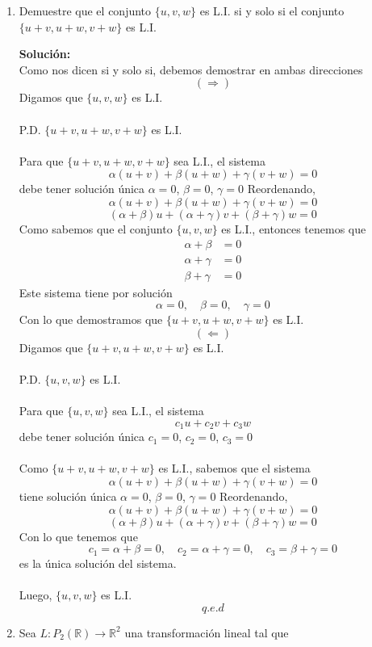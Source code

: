 \documentclass[12pt]{article}
\newenvironment{solucion}
{\begin{mdframed}[backgroundcolor=black!10]
		{\bf Solución:}\\
	}
	{
	\end{mdframed}
}
\newenvironment{preguntas}
{\begin{enumerate}\itemsep12pt
	}
	{
	\end{enumerate}
}
\newcommand{\ra}{\rightarrow}
\newcommand{\R}{\mathbb{R}}
\begin{document}
\begin{preguntas}
\begin{solucion}
\end{solucion}
\item Demuestre que el conjunto $\{u, v, w\}$ es L.I. si y solo si el conjunto $\{u+v, u+w, v+w\}$ es L.I.
\begin{solucion}
Como nos dicen si y solo si, debemos demostrar en ambas direcciones
		$$(\Longrightarrow)$$
		Digamos que $\{u, v, w\}$ es L.I.\\
		\\
		P.D. $\{u+v, u+w, v+w\}$ es L.I.\\
		\\
		Para que $\{u+v, u+w, v+w\}$ sea L.I., el sistema
		$$\alpha (u+v) + \beta (u+w) + \gamma (v+w) = 0$$
		debe tener solución única $\alpha = 0$, $\beta = 0$, $\gamma = 0$
		Reordenando,
		$$\alpha (u+v) + \beta (u+w) + \gamma (v+w) = 0$$
		$$(\alpha + \beta) u + (\alpha + \gamma) v + (\beta + \gamma) w = 0$$
		Como sabemos que el conjunto $\{u, v, w\}$ es L.I., entonces tenemos que
		$$\begin{array}{rl}
		\alpha + \beta & = 0\\
		\alpha + \gamma & = 0\\
		\beta + \gamma & = 0
		\end{array}$$
		Este sistema tiene por solución
		$$\alpha = 0, \quad \beta = 0, \quad \gamma = 0$$
		Con lo que demostramos que $\{u+v, u+w, v+w\}$ es L.I.
		$$(\Longleftarrow)$$
		Digamos que $\{u+v, u+w, v+w\}$ es L.I.\\
		\\
		P.D. $\{u, v, w\}$ es L.I.\\
		\\
		Para que $\{u, v, w\}$ sea L.I., el sistema
		$$c_1u + c_2v + c_3w$$
		debe tener solución única $c_1 = 0$, $c_2 = 0$, $c_3 = 0$\\
		\\
		Como $\{u+v, u+w, v+w\}$ es L.I., sabemos que el sistema
		$$\alpha (u+v) + \beta (u+w) + \gamma (v+w) = 0$$
		tiene solución única $\alpha = 0$, $\beta = 0$, $\gamma = 0$
		Reordenando,
		$$\alpha (u+v) + \beta (u+w) + \gamma (v+w) = 0$$
		$$(\alpha + \beta) u + (\alpha + \gamma) v + (\beta + \gamma) w = 0$$
		Con lo que tenemos que
		$$c_1 = \alpha + \beta = 0, \quad c_2 = \alpha + \gamma = 0, \quad c_3 = \beta + \gamma = 0$$
		es la única solución del sistema. \\
		\\
		Luego, $\{u, v, w\}$ es L.I.
		$$q.e.d$$
\end{solucion}
\item Sea $L: P_2(\R) \ra \R^2$ una transformación lineal tal que

\end{preguntas}
\end{document}
